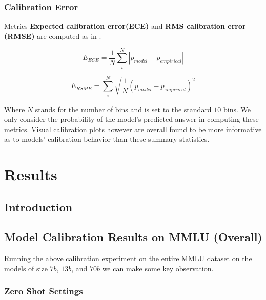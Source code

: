 \documentclass[11pt]{article}
\begin{document}
\subsubsection{Calibration Error}

Metrics \textbf{Expected calibration error(ECE)} and \textbf{RMS calibration error (RMSE)} are computed as in \cite{kadavath2022language}. 

\begin{equation}
    E_{ECE} = \frac{1}{N}  \sum_{i}^N | p_{model} - p_{empirical}|
\end{equation}

\begin{equation}
    E_{RSME} = \sum_{i}^N \sqrt{\frac{1}{N} (p_{model} - p_{empirical})^2}
\end{equation}

Where $N$ stands for the number of bins and is set to the standard $10$ bins. We only consider 
the probability of the model's predicted answer in computing these metrics. 
Visual calibration plots however are overall found to be more 
informative as to models' calibration behavior than these summary statistics.

\section{Results}


\subsection{Introduction}


\subsection{Model Calibration Results on MMLU (Overall)}

Running the above calibration experiment on the entire 
MMLU dataset on the models of size $7b$, $13b$, and $70b$ 
we can make some key observation. 

\subsubsection{Zero Shot Settings}
\end{document}
